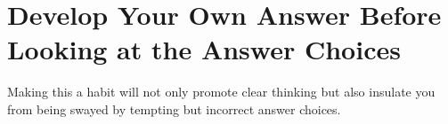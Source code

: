 \section{Develop Your Own Answer Before Looking at the Answer Choices}

Making this a habit will not only promote clear thinking but also insulate you from being swayed by tempting but incorrect answer choices.
